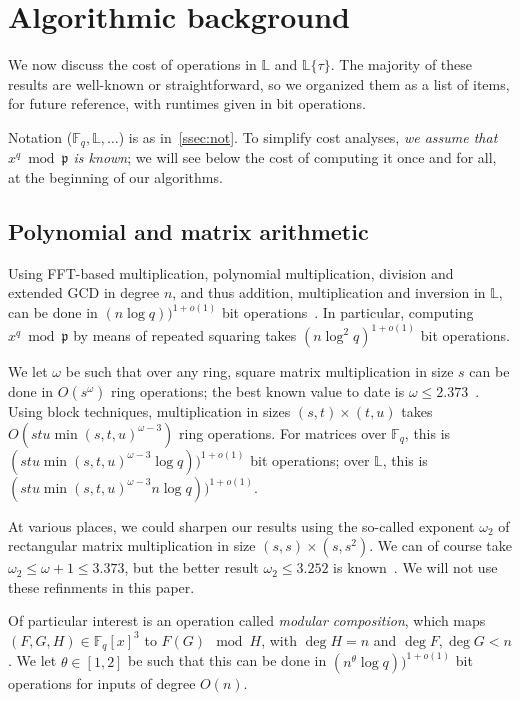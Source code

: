 \documentclass[sigconf]{acmart}
\newcommand{\F}{\mathbb{F}}
\renewcommand{\L}{\mathbb{L}}
\newcommand{\ang}[1]{\{#1\}}
\newcommand{\frakp}{\mathfrak{p}}
\begin{document}
\section{Algorithmic background}

We now discuss the cost of operations in $\L$ and $\L\ang{\tau}$. The
majority of these results are well-known or straightforward, so we
organized them as a list of items, for future reference, with runtimes
given in bit operations.

Notation ($\F_q,\L,\dots$) is as in~\ref{ssec:not}. To simplify cost
analyses, {\em we assume that $x^q \bmod \frakp$ is known}; we will
see below the cost of computing it once and for all, at the beginning
of our algorithms.



\subsection{Polynomial and matrix arithmetic}\label{ssec:basicpoly}


\smallskip{}  Using FFT-based multiplication,
polynomial multiplication, division and extended GCD in degree $n$,
and thus addition, multiplication and inversion in $\L$, can be done
in $(n\log q))^{1+o(1)}$ bit
operations~\cite{Gathen:2003:MCA:945759}. In particular, computing $x^q \bmod \frakp$
 by means of repeated squaring takes $(n\log^2 q)^{1+o(1)}$
bit operations.

\smallskip{}  We let $\omega$ be such that over any
ring, square matrix multiplication in size $s$ can be done in
$O(s^\omega)$ ring operations; the best known value to date is $\omega
\le 2.373$~\cite{CoWi90,LeGall14}. Using block techniques,
multiplication in sizes $(s,t) \times (t,u)$ takes $O(stu
\min(s,t,u)^{\omega-3})$ ring operations. For matrices over
$\F_q$, this is $(stu \min(s,t,u)^{\omega-3} \log q))^{1+o(1)}$ bit
operations; over $\L$, this is $(stu \min(s,t,u)^{\omega-3}
n\log q))^{1+o(1)}$.

At various places, we could sharpen our results using the so-called
exponent $\omega_2$ of rectangular matrix multiplication in size
$(s,s) \times (s,s^2)$. We can of course take $\omega_2\le\omega+1 \le
3.373$, but the better result $\omega_2 \le 3.252$ is
known~\cite{LeUr18}. We will not use these refinments in this paper.

\smallskip{} Of particular interest is an operation
called {\em modular composition}, which maps $(F,G,H) \in \F_q[x]^3$
to $F(G) \mod H$, with $\deg H=n$ and $\deg F,\deg G < n$.  We let
$\theta \in [1,2]$ be such that this can be done in $(n^\theta
\log q))^{1+o(1)}$ bit operations for inputs of degree $O(n)$.
\end{document}
